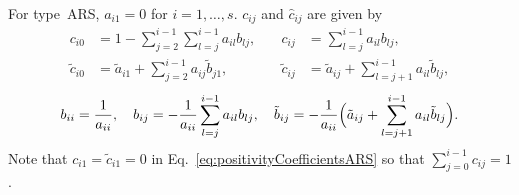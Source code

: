 For type~ARS, $a_{i1} = 0$ for $i=1,\ldots,s$.
$c_{ij}$ and $\hat{c}_{ij}$ are given by
    \begin{equation}
     \begin{aligned}
      c_{i0} &= 1-\sum_{j=2}^{i-1}\sum_{l=j}^{i-1}a_{il}b_{lj}, \quad &
      c_{ij} &= \sum_{l=j}^{i-1}a_{il}b_{lj}, \\
      \tilde{c}_{i0} &= \tilde{a}_{i1}+\sum_{j=2}^{i-1}a_{ij}\tilde{b}_{j1}, \quad &
      \tilde{c}_{ij} &= \tilde{a}_{ij}+\sum_{l=j+1}^{i-1}a_{il}\tilde{b}_{lj},  
     \end{aligned}
     \label{eq:positivityCoefficientsARS}
    \end{equation}
    \begin{equation}
      b_{ii} = \frac{1}{a_{ii}}, \quad
      b_{ij} = -\frac{1}{a_{ii}}\sum_{l=j}^{i-1}a_{il}b_{lj}, \quad
      \tilde{b}_{ij} = -\frac{1}{a_{ii}}\Big(\tilde{a}_{ij}+\sum_{l=j+1}^{i-1}a_{il}\tilde{b}_{lj}\Big).  
    \end{equation}
    Note that $c_{i1}=\tilde{c}_{i1}=0$ in Eq.~\eqref{eq:positivityCoefficientsARS} so that $\sum_{j=0}^{i-1}c_{ij}=1$.
    

